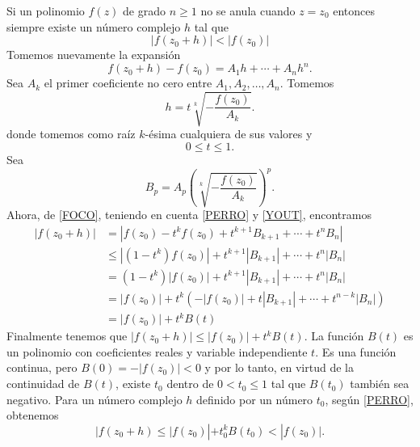 \begin{lemma}\label{LEMAIMPORTANTE2}
    Si un polinomio $f(z)$ de grado $n \geq 1$ no se anula cuando $z = z_0$ entonces siempre existe un número complejo $h$ tal que
    $$|f(z_0+h)|<|f(z_0)|$$
    \demostracion Tomemos nuevamente la expansión
    \begin{equation}
        f(z_0+h)-f(z_0)=A_1h+\cdots +A_nh^n. \label{FOCO}
    \end{equation}
    Sea $A_k$ el primer coeficiente no cero entre $A_1,  A_2,  \dots,  A_n$. Tomemos
    \begin{equation}
        h=t \sqrt[k]{-\frac{f(z_0)}{A_k}}. \label{PERRO}
    \end{equation}
    donde tomemos como raíz $k$-ésima cualquiera de sus valores y
    \begin{equation}
        0 \leq t \leq 1. \label{YOUT}
    \end{equation}
    Sea
    $$B_p=A_p \left( \sqrt[k]{-\frac{f(z_0)}{A_k}} \right) ^p.$$
    Ahora, de \eqref{FOCO}, teniendo en cuenta \eqref{PERRO} y \eqref{YOUT}, encontramos
    \begin{align*}
        |f(z_0+h)| &= \left| f(z_0)-t^kf(z_0)+t^{k+1}B_{k+1}+ \cdots +t^nB_n \right| \\
        & \leq \left| \left( 1-t^k \right) f(z_0) \right| +t^{k+1}|B_{k+1}|+ \cdots +t^n |B_n| \\
        &=\left( 1-t^k \right) |f(z_0)| + t^{k+1}|B_{k+1}|+ \cdots + t^n|B_n| \\
        &=|f(z_0)|+t^k \left( -|f(z_0)|+t|B_{k+1}|+ \cdots + t^{n-k}|B_n| \right) \\
        &=|f(z_0)| + t^k B(t)
    \end{align*}
    Finalmente tenemos que $|f(z_0+h)| \leq |f(z_0)| + t^k B(t)$. La función $B(t)$ es un polinomio con coeficientes reales y variable independiente $t$. Es una función continua, pero $B (0) = -|f (z_0)| <0$ y por lo tanto, en virtud de la continuidad de $B(t)$, existe $t_0$ dentro de $0 < t_0 \leq 1$ tal que $B(t_0)$ también sea negativo. Para un número complejo $h$ definido por un número $t_0$, según \eqref{PERRO}, obtenemos
    $$|f(z_0+h) \leq |f(z_0)| + t_0^k B(t_0) < |f(z_0)|.$$
\end{lemma}

